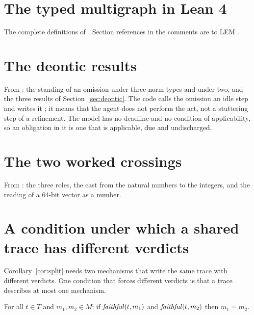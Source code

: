 \section{The typed multigraph in Lean 4}
\label{app:basic}

The complete definitions of . Section references in the
comments are to LEM \citep{kreinzlem}.



\section{The deontic results}
\label{app:deontic}

From : the standing of an omission under three norm types and
under two, and the three results of Section~\ref{sec:deontic}. The code calls the
omission an idle step and writes it ; it means that the agent does not
perform the act, not a stuttering step of a refinement. The model has no deadline and no
condition of applicability, so an obligation in it is one that is applicable, due and
undischarged.



\section{The two worked crossings}
\label{app:crossing}

From : the three roles, the cast from the natural numbers to
the integers, and the reading of a 64-bit vector as a number.



\section{A condition under which a shared trace has different verdicts}
\label{app:uniqueness}

Corollary~\ref{cor:split} needs two mechanisms that write the same trace with different
verdicts. One condition that forces different verdicts is that a trace describes at
most one mechanism.

\begin{assumption}
\label{ass:functional}
For all $t \in T$ and $m_1, m_2 \in M$: if $\mathit{faithful}(t,m_1)$ and $\mathit{faithful}(t,m_2)$ then
$m_1 = m_2$.
\end{assumption}

